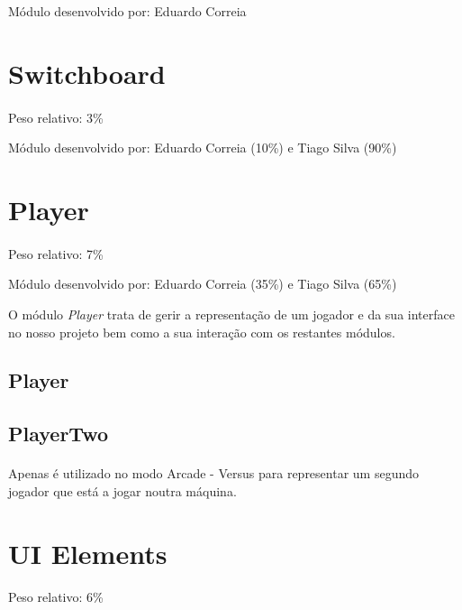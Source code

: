 \documentclass{report}
\begin{document}
Módulo desenvolvido por: Eduardo Correia

\section{Switchboard}

\paragraph{}
Peso relativo: 3\%

Módulo desenvolvido por: Eduardo Correia (10\%) e Tiago Silva (90\%)

\section{Player}

\paragraph{}
Peso relativo: 7\%

Módulo desenvolvido por: Eduardo Correia (35\%) e Tiago Silva (65\%) 

O módulo \textit{Player} trata de gerir a representação de um jogador e da sua interface no nosso projeto bem como a sua interação com os restantes módulos. 

\subsection{Player}

\subsection{PlayerTwo}

\paragraph{}
Apenas é utilizado no modo Arcade - Versus para representar um segundo jogador que está a jogar noutra máquina. 

\section{UI Elements}

\paragraph{}
Peso relativo: 6\%
\end{document}
